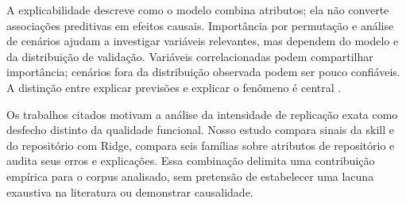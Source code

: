 A explicabilidade descreve como o modelo combina atributos; ela não
converte associações preditivas em efeitos causais. Importância por
permutação e análise de cenários ajudam a investigar variáveis
relevantes, mas dependem do modelo e da distribuição de validação.
Variáveis correlacionadas podem compartilhar importância; cenários fora
da distribuição observada podem ser pouco confiáveis. A distinção entre
explicar previsões e explicar o fenômeno é central
\cite{molnar2020interpretable,shmueli2010explain,breiman2001statistical}.

Os trabalhos citados motivam a análise da intensidade de replicação
exata como desfecho distinto da qualidade funcional. Nosso estudo
compara sinais da skill e do repositório com Ridge, compara seis
famílias sobre atributos de repositório e audita seus erros e
explicações. Essa combinação delimita uma contribuição empírica para o
corpus analisado, sem pretensão de estabelecer uma lacuna exaustiva na
literatura ou demonstrar causalidade.
